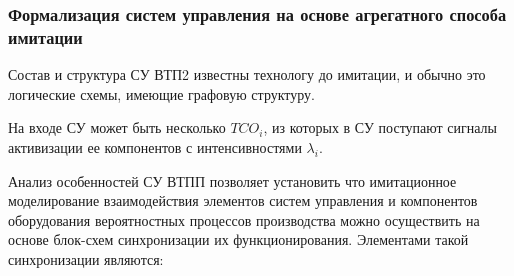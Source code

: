 \subsubsection{Формализация систем управления на основе агрегатного способа имитации}

Состав и структура СУ ВТП2 известны технологу до имитации, и обычно это логические схемы, имеющие графовую структуру.

На входе СУ может быть несколько  $TCO_i$, из которых в СУ поступают сигналы активизации ее компонентов с интенсивностями $\lambda_i$.


Анализ особенностей СУ ВТПП позволяет установить что имитационное моделирование взаимодействия элементов систем управления и компонентов оборудования вероятностных процессов производства можно осуществить на основе блок-схем синхронизации их функционирования. Элементами такой синхронизации являются:
